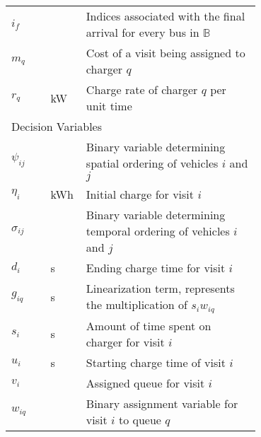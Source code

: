 \documentclass[utf8]{FrontiersinHarvard}
\begin{document}
\begin{table}[!htpb]
\begin{tabularx}{\textwidth}{l r l p{0.7\linewidth}}
    $i_f$            & &       & Indices associated with the final arrival for every bus in $\mathbb{B}$                                         \\
    $m_q$            & &       & Cost of a visit being assigned to charger $q$                                                                   \\
    $r_q$            & & kW    & Charge rate of charger $q$ per unit time                                                                        \\
    \hline \multicolumn{4}{l}{Decision Variables}                                                                                                \\
    \hline $\psi_{ij}$  & &       & Binary variable determining spatial ordering of vehicles $i$ and $j$                                            \\
    $\eta_i$            & & kWh   & Initial charge for visit $i$                                                                                    \\
    $\sigma_{ij}$         & &       & Binary variable determining temporal ordering of vehicles $i$ and $j$                                           \\
    $d_i$            & & s     & Ending charge time for visit $i$                                                                                \\
    $g_{iq}$         & & s     & Linearization term, represents the multiplication of $s_i w_{iq}$                                               \\
    $s_i$            & & s     & Amount of time spent on charger for visit $i$                                                                   \\
    $u_i$            & & s     & Starting charge time of visit $i$                                                                               \\
    $v_i$            & &       & Assigned queue for visit $i$                                                                                    \\
    $w_{iq}$         & &       & Binary assignment variable for visit $i$ to queue $q$                                                           \\
    \bottomrule
  \end{tabularx}
\end{table}
\end{document}
